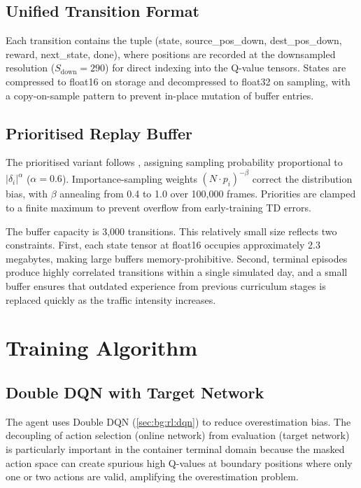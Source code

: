 \subsection{Unified Transition Format}
\label{sec:agent:replay:transition}

Each transition contains the tuple (state, source\_pos\_down, dest\_pos\_down, reward, next\_state, done), where positions are recorded at the downsampled resolution ($S_\text{down} = 290$) for direct indexing into the Q-value tensors. States are compressed to float16 on storage and decompressed to float32 on sampling, with a copy-on-sample pattern to prevent in-place mutation of buffer entries.

\subsection{Prioritised Replay Buffer}
\label{sec:agent:replay:prioritised}

The prioritised variant follows \cite{schaul2016per}, assigning sampling probability proportional to $|\delta_i|^\alpha$ ($\alpha = 0.6$). Importance-sampling weights $(N \cdot p_i)^{-\beta}$ correct the distribution bias, with $\beta$ annealing from 0.4 to 1.0 over 100{,}000 frames. Priorities are clamped to a finite maximum to prevent overflow from early-training TD errors.

The buffer capacity is 3{,}000 transitions. This relatively small size reflects two constraints. First, each state tensor at float16 occupies approximately 2.3 megabytes, making large buffers memory-prohibitive. Second, terminal episodes produce highly correlated transitions within a single simulated day, and a small buffer ensures that outdated experience from previous curriculum stages is replaced quickly as the traffic intensity increases.

\section{Training Algorithm}
\label{sec:agent:training}

\subsection{Double DQN with Target Network}
\label{sec:agent:training:ddqn}

The agent uses Double DQN (\cref{sec:bg:rl:dqn}) to reduce overestimation bias. The decoupling of action selection (online network) from evaluation (target network) is particularly important in the container terminal domain because the masked action space can create spurious high Q-values at boundary positions where only one or two actions are valid, amplifying the overestimation problem.

